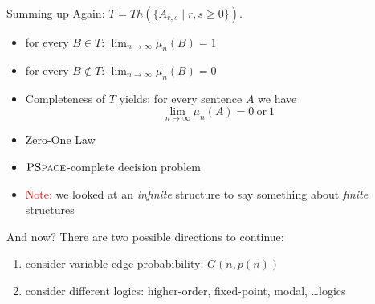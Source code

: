 \documentclass[handout]{beamer}
\renewcommand{\emph}[1]{\textcolor{red}{#1}}
\begin{document}
\begin{frame}{Summing up}
  Again: $T=Th(\{A_{r,s}\mid r,s\geq 0\})$. 
  \begin{itemize}
    \item for every $B\in T$: $\lim_{n\rightarrow\infty} \mu_n(B)=1$
    \item for every $B\notin T$: $\lim_{n\rightarrow\infty} \mu_n(B)=0$
    \item Completeness of $T$ yields: for every sentence $A$ we have
  $$\lim_{n\rightarrow\infty}\mu_n(A)=0\mathrm{\ or\ } 1$$
    \item Zero-One Law
      \pause
    \item $\textsc{PSpace}$-complete decision problem
      \pause
    \item \emph{Note:} we looked at an \textit{infinite} structure to say something about \textit{finite} structures
  \end{itemize}

\end{frame}


\begin{frame}{And now?}
  There are two possible directions to continue:

  \bigskip
  \begin{enumerate}
    \item consider variable edge probabibility: $G(n,p(n))$
      \pause
    \item consider different logics: higher-order, fixed-point, modal, \dots logics
  \end{enumerate}
  
\end{frame}
\end{document}
